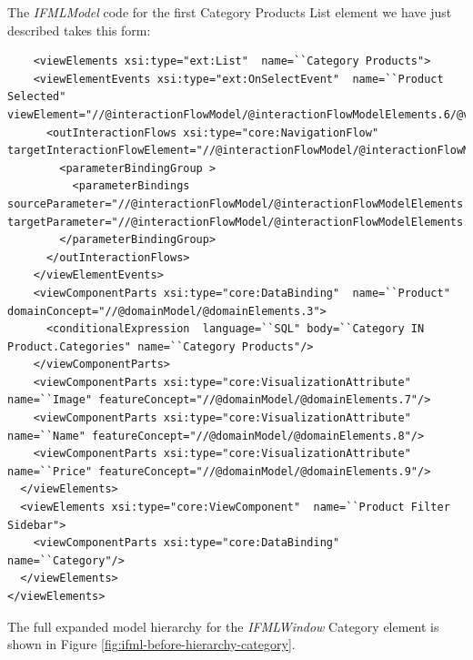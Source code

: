 The \textit{IFMLModel} code for the first Category Products List element we have just described takes this form: 
\vspace{0.5cm}
\lstset{language=XML}
\begin{lstlisting} 
    <viewElements xsi:type="ext:List"  name=``Category Products">
    <viewElementEvents xsi:type="ext:OnSelectEvent"  name=``Product Selected" viewElement="//@interactionFlowModel/@interactionFlowModelElements.6/@viewElements.1/@viewElements.0">
      <outInteractionFlows xsi:type="core:NavigationFlow"  targetInteractionFlowElement="//@interactionFlowModel/@interactionFlowModelElements.1">
        <parameterBindingGroup >
          <parameterBindings  sourceParameter="//@interactionFlowModel/@interactionFlowModelElements.1/@parameters.0" targetParameter="//@interactionFlowModel/@interactionFlowModelElements.1/@parameters.0"/>
        </parameterBindingGroup>
      </outInteractionFlows>
    </viewElementEvents>
    <viewComponentParts xsi:type="core:DataBinding"  name=``Product" domainConcept="//@domainModel/@domainElements.3">
      <conditionalExpression  language=``SQL" body=``Category IN Product.Categories" name=``Category Products"/>
    </viewComponentParts>
    <viewComponentParts xsi:type="core:VisualizationAttribute"  name=``Image" featureConcept="//@domainModel/@domainElements.7"/>
    <viewComponentParts xsi:type="core:VisualizationAttribute"  name=``Name" featureConcept="//@domainModel/@domainElements.8"/>
    <viewComponentParts xsi:type="core:VisualizationAttribute"  name=``Price" featureConcept="//@domainModel/@domainElements.9"/>
  </viewElements>
  <viewElements xsi:type="core:ViewComponent"  name=``Product Filter Sidebar">
    <viewComponentParts xsi:type="core:DataBinding"  name=``Category"/>
  </viewElements>
</viewElements>
\end{lstlisting}

The full expanded model hierarchy for the \textit{IFMLWindow} Category element is shown in Figure \ref{fig:ifml-before-hierarchy-category}.

